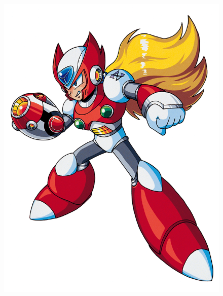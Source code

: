 \begin{figure}[htp]
	\centering
	\includegraphics[height=\portraitsize]{figures/X1/Zero_X1.png}

\end{figure}
